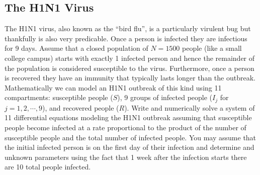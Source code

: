\subsection{The H1N1 Virus}
The H1N1 virus, also known as the ``bird flu'', is a particularly virulent bug but
thankfully is also very predicable.  Once a person is infected they are infectious for
9 days.  Assume that a closed population of $N = 1500$ people (like a small college
campus) starts with exactly 1 infected person and hence the remainder of the
population is considered susceptible to the virus.  Furthermore, once a person is
recovered they have an immunity that typically lasts longer than the outbreak.
Mathematically we can model an H1N1 outbreak of this kind using 11 compartments:
susceptible people ($S$), 9 groups of infected people ($I_j$ for $j=1, 2, \cdots, 9$),
and recovered people ($R$). Write and numerically solve a system of 11 differential equations modeling the
H1N1 outbreak assuming that susceptible people become infected at a rate proportional
to the product of the number of susceptible people and the total number of infected
people. You may assume that the initial infected person is on the first day of their
infection and determine and unknown parameters using the fact that 1 week after the
infection starts there are 10 total people infected. 


